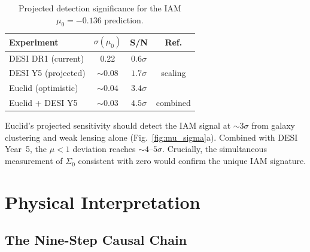 \documentclass[11pt]{article}
\begin{document}
\begin{table}[h]
\centering
\begin{tabular}{lccc}
\hline
Experiment & $\sigma(\mu_0)$ & S/N & Ref. \\
\hline
DESI DR1 (current) & 0.22 & $0.6\sigma$ & \citep{DESIDR1} \\
DESI Y5 (projected) & $\sim 0.08$ & $1.7\sigma$ & scaling \\
Euclid (optimistic) & $\sim 0.04$ & $3.4\sigma$ & \citep{Frusciante2025} \\
Euclid + DESI Y5 & $\sim 0.03$ & $4.5\sigma$ & combined \\
\hline
\end{tabular}
\caption{Projected detection significance for the IAM $\mu_0 = -0.136$
prediction.}
\label{tab:detection}
\end{table}

Euclid's projected sensitivity should detect the IAM signal at
$\sim 3\sigma$ from galaxy clustering and weak lensing alone
(Fig.~\ref{fig:mu_sigma}a).  Combined with
DESI Year~5, the $\mu < 1$ deviation reaches $\sim 4$--$5\sigma$.
Crucially, the simultaneous measurement of $\Sigma_0$ consistent with zero
would confirm the unique IAM signature.


\section{Physical Interpretation}
\label{sec:interpretation}

\subsection{The Nine-Step Causal Chain}
\end{document}

